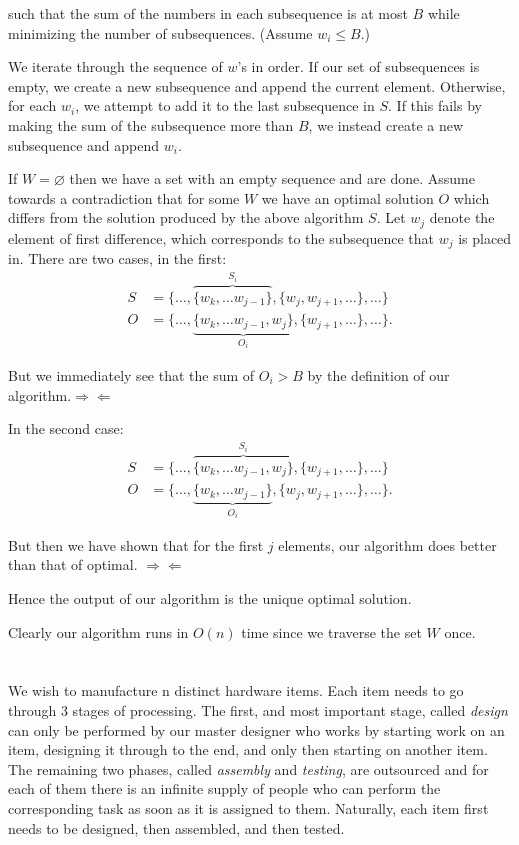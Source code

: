 \documentclass{amsart}
\theoremstyle{definition}
\theoremstyle{remark}
\numberwithin{equation}{section}
\let\null\varnothing
\begin{document}
such that the sum of the numbers in each subsequence is at most $B$ while
minimizing the number of subsequences. (Assume $w_i \leq B$.)

\algstar We iterate through the sequence of $w$'s in order. If our set
of subsequences is empty, we create a new subsequence and append the
current element. Otherwise, for each $w_i$, we attempt to add it to
the last subsequence in $S$. If this fails by making the sum of the
subsequence more than $B$, we instead create a new subsequence and append
$w_i$.

\proof If $W = \null$ then we have a set with an empty sequence and
are done. Assume towards a contradiction that for some $W$ we have an
optimal solution $O$ which differs from the solution produced by the
above algorithm $S$. Let $w_j$ denote the element of first difference,
which corresponds to the subsequence that $w_j$ is placed in. There are
two cases, in the first:
\begin{align*}
  S &= \{ \ldots, \overbrace{\{w_k, \ldots  w_{j-1}\} }^{S_i}, \{w_j, w_{j+1},\ldots \}, \ldots \} \\
  O &= \{ \ldots, \underbrace{\{w_k, \ldots w_{j-1}, w_j \}}_{O_i}, \{w_{j+1},\ldots \}, \ldots \}.
\end{align*}

But we immediately see that the sum of $O_i > B$ by the definition of our
algorithm.$\Rightarrow \Leftarrow$

In the second case:
\begin{align*}
  S &= \{ \ldots, \overbrace{\{w_k, \ldots  w_{j-1}, w_j \} }^{S_i}, \{w_{j+1},\ldots \}, \ldots \} \\
  O &= \{ \ldots, \underbrace{\{w_k, \ldots w_{j-1} \}}_{O_i}, \{ w_j, w_{j+1},\ldots \}, \ldots \}.
\end{align*}

But then we have shown that for the first $j$ elements, our algorithm does better than
that of optimal. $\Rightarrow \Leftarrow$

Hence the output of our algorithm is the unique optimal solution.

\rmkstar Clearly our algorithm runs in $O(n)$ time since we traverse the
set $W$ once.

\section{}

We wish to manufacture n distinct hardware items. Each item needs to go
through 3 stages of processing. The first, and most important stage,
called \textit{design} can only be performed by our master designer who works
by starting work on an item, designing it through to the end, and only
then starting on another item. The remaining two phases, called \textit{assembly}
and \textit{testing}, are outsourced and for each of them there is an infinite
supply of people who can perform the corresponding task as soon as it is
assigned to them. Naturally, each item first needs to be designed, then
assembled, and then tested.
\end{document}
